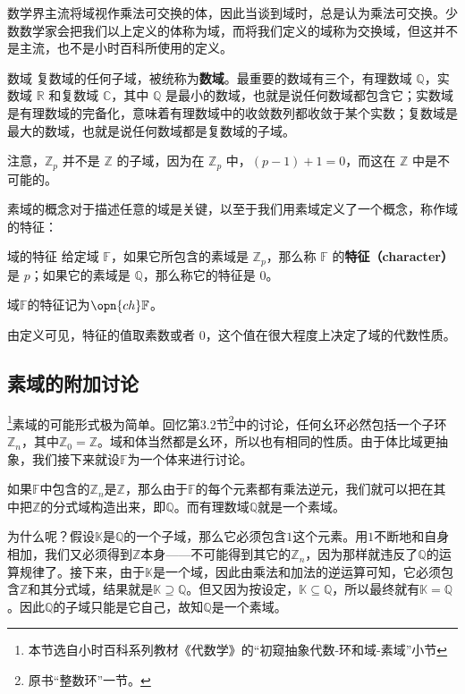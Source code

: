
数学界主流将域视作乘法可交换的体，因此当谈到域时，总是认为乘法可交换。少数数学家会把我们以上定义的体称为域，而将我们定义的域称为交换域，但这并不是主流，也不是小时百科所使用的定义。

\begin{example}{数域}
复数域的任何子域，被统称为\textbf{数域}。最重要的数域有三个，有理数域 $\mathbb{Q}$，实数域 $\mathbb{R}$ 和复数域 $\mathbb{C}$，其中 $\mathbb{Q}$ 是最小的数域，也就是说任何数域都包含它；实数域是有理数域的完备化，意味着有理数域中的收敛数列都收敛于某个实数；复数域是最大的数域，也就是说任何数域都是复数域的子域。

注意，$\mathbb{Z}_p$ 并不是 $\mathbb{Z}$ 的子域，因为在 $\mathbb{Z}_p$ 中，$(p-1)+1=0$，而这在 $\mathbb{Z}$ 中是不可能的。
\end{example}

素域的概念对于描述任意的域是关键，以至于我们用素域定义了一个概念，称作域的特征：

\begin{definition}{域的特征}\label{def_field_2}
给定域 $\mathbb{F}$，如果它所包含的素域是 $\mathbb{Z}_p$，那么称 $\mathbb{F}$ 的\textbf{特征（character）}是 $p$；如果它的素域是 $\mathbb{Q}$，那么称它的特征是 $0$。

域$\mathbb{F}$的特征记为$\opn{ch}\mathbb{F}$。
\end{definition}

由定义可见，特征的值取素数或者 $0$，这个值在很大程度上决定了域的代数性质。


\subsection{素域的附加讨论}

\footnote{本节选自小时百科系列教材《代数学》的“初窥抽象代数-环和域-素域”小节}素域的可能形式极为简单。回忆第3.2节\footnote{原书“整数环”一节。}中的讨论，任何幺环必然包括一个子环$\mathbb{Z}_n$，其中$\mathbb{Z}_0=\mathbb{Z}$。域和体当然都是幺环，所以也有相同的性质。由于体比域更抽象，我们接下来就设$\mathbb{F}$为一个体来进行讨论。

如果$\mathbb{F}$中包含的$\mathbb{Z}_n$是$\mathbb{Z}$，那么由于$\mathbb{F}$的每个元素都有乘法逆元，我们就可以把在其中把$\mathbb{Z}$的分式域构造出来，即$\mathbb{Q}$。而有理数域$\mathbb{Q}$就是一个素域。

为什么呢？假设$\mathbb{K}$是$\mathbb{Q}$的一个子域，那么它必须包含$1$这个元素。用$1$不断地和自身相加，我们又必须得到$\mathbb{Z}$本身——不可能得到其它的$\mathbb{Z}_n$，因为那样就违反了$\mathbb{Q}$的运算规律了。接下来，由于$\mathbb{K}$是一个域，因此由乘法和加法的逆运算可知，它必须包含$\mathbb{Z}$和其分式域，结果就是$\mathbb{K}\supseteq\mathbb{Q}$。但又因为按设定，$\mathbb{K}\subseteq\mathbb{Q}$，所以最终就有$\mathbb{K}=\mathbb{Q}$。因此$\mathbb{Q}$的子域只能是它自己，故知$\mathbb{Q}$是一个素域。

